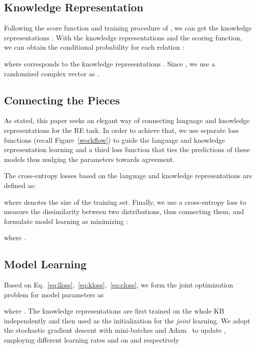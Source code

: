 \documentclass[11pt,a4paper]{article}
\begin{document}
\subsection{Knowledge Representation}
\label{subsection:k}



Following the score function  and training procedure of \citet{trouillon2016complex}, we can get the knowledge representations .
With the knowledge representations and the scoring function, we can obtain the conditional probability  for each relation :


\noindent where  corresponds to the knowledge representations .
Since , we use a randomized complex vector as .




\subsection{Connecting the Pieces}

As stated, this paper seeks an elegant way of connecting language and knowledge representations for the RE task.
In order to achieve that, we use separate loss functions (recall Figure~\ref{workflow}) to guide the language and knowledge representation learning and a third loss function that ties the predictions of these models thus nudging the parameters towards agreement.






The cross-entropy losses based on the language and knowledge representations are defined as:
 

\noindent where  denotes the size of the training set.
Finally, we use a cross-entropy loss to measure the dissimilarity between two distributions, thus connecting them, and formulate model learning as minimizing :



\noindent where .




\subsection{Model Learning}

Based on Eq.~\ref{eq:lloss},~\ref{eq:kloss},~\ref{eq:closs}, we form the joint optimization problem for model parameters as

\noindent where . The knowledge representations are first trained on the whole KB independently and then used as the initialization for the \emph{joint} learning.
We adopt the stochastic gradient descent with mini-batches and Adam~\cite{kingma2014adam} to update , employing different learning rates  and  on  and  respectively
\end{document}
